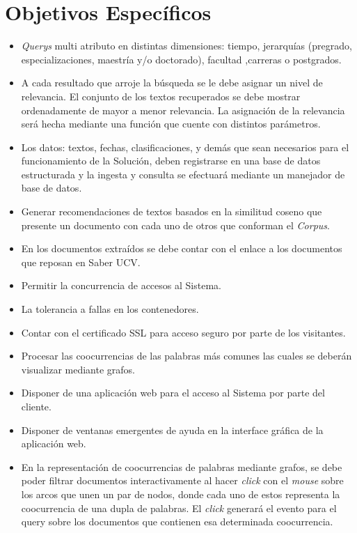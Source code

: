 \documentclass[
  10,
  spanish,
  openany]{book}
\begin{document}
\hypertarget{objetivosespe}{%
\section{Objetivos Específicos}\label{objetivosespe}}

\begin{itemize}
\item
  \emph{Querys} multi atributo en distintas dimensiones: tiempo, jerarquías (pregrado, especializaciones, maestría y/o doctorado), facultad ,carreras o postgrados.
\item
  A cada resultado que arroje la búsqueda se le debe asignar un nivel de relevancia. El conjunto de los textos recuperados se debe mostrar ordenadamente de mayor a menor relevancia. La asignación de la relevancia será hecha mediante una función que cuente con distintos parámetros.
\item
  Los datos: textos, fechas, clasificaciones, y demás que sean necesarios para el funcionamiento de la Solución, deben registrarse en una base de datos estructurada y la ingesta y consulta se efectuará mediante un manejador de base de datos.
\item
  Generar recomendaciones de textos basados en la similitud coseno que presente un documento con cada uno de otros que conforman el \emph{Corpus}.
\item
  En los documentos extraídos se debe contar con el enlace a los documentos que reposan en Saber UCV.
\item
  Permitir la concurrencia de accesos al Sistema.
\item
  La tolerancia a fallas en los contenedores.
\item
  Contar con el certificado SSL para acceso seguro por parte de los visitantes.
\item
  Procesar las coocurrencias de las palabras más comunes las cuales se deberán visualizar mediante grafos.
\item
  Disponer de una aplicación web para el acceso al Sistema por parte del cliente.
\item
  Disponer de ventanas emergentes de ayuda en la interface gráfica de la aplicación web.
\item
  En la representación de coocurrencias de palabras mediante grafos, se debe poder filtrar documentos interactivamente al hacer \emph{click} con el \emph{mouse} sobre los arcos que unen un par de nodos, donde cada uno de estos representa la coocurrencia de una dupla de palabras. El \emph{click} generará el evento para el query sobre los documentos que contienen esa determinada coocurrencia.
\end{itemize}
\end{document}
